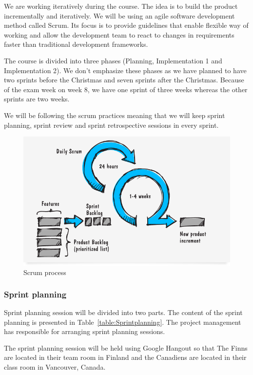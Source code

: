 We are working iteratively during the course. The idea is to build the product 
incrementally and iteratively. We will be using an agile software development 
method called Scrum. Its focus is to provide guidelines that enable flexible 
way of working and allow the development team to react to changes in 
requirements faster than traditional development frameworks.

The course is divided into three phases (Planning, Implementation 1 and 
Implementation 2). We don't emphasize these phases as we have planned to have two sprints before the Christmas and seven sprints after the Christmas. Because of the exam week on week 8, we have one sprint of three weeks whereas the other sprints are two weeks. 

We will be following the scrum practices meaning that we will keep sprint planning, sprint review and sprint retrospective sessions in every sprint.

\begin{figure}[H]
\centering
\includegraphics[width=1\textwidth]{imgs/scrum_process_en.png}
\caption{Scrum process}
\label{fig:scrum}
\end{figure}

\subsubsection{Sprint planning}

Sprint planning session will be divided into two parts. The content of the 
sprint planning is presented in Table~\ref{table:Sprintplanning}. The project management has responsible for arranging sprint planning sessions.

The sprint planning session will be held using Google Hangout so that The Finns are located in their team room in Finland and the Canadiens are located in their class room in Vancouver, Canada.

